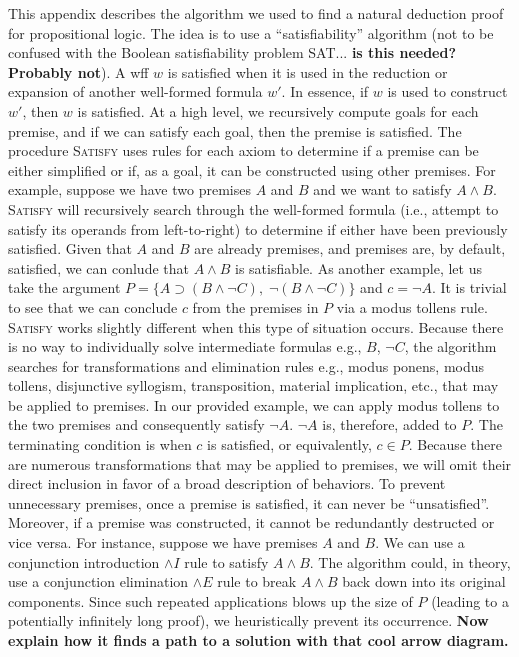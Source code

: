 \documentclass[ms]{uncgdissertationexp2}
\theoremstyle{plain}
\theoremstyle{definition}
\theoremstyle{remark}
\begin{document}
This appendix describes the algorithm we used to find a natural deduction proof for propositional logic. The idea is to use a ``satisfiability'' algorithm (not to be confused with the Boolean satisfiability problem SAT... \textbf{is this needed? Probably not}). A wff $w$ is satisfied when it is used in the reduction or expansion of another well-formed formula $w'$. In essence, if $w$ is used to construct $w'$, then $w$ is satisfied. At a high level, we recursively compute goals for each premise, and if we can satisfy each goal, then the premise is satisfied. The procedure \textsc{Satisfy} uses rules for each axiom to determine if a premise can be either simplified or if, as a goal, it can be constructed using other premises. For example, suppose we have two premises $A$ and $B$ and we want to satisfy $A \land B$. \textsc{Satisfy} will recursively search through the well-formed formula (i.e., attempt to satisfy its operands from left-to-right) to determine if either have been previously satisfied. Given that $A$ and $B$ are already premises, and premises are, by default, satisfied, we can conlude that $A \land B$ is satisfiable. As another example, let us take the argument $P = \{A \supset (B \land \lnot C),\;\lnot (B \land \lnot C)\}$ and $c = \lnot A$. It is trivial to see that we can conclude $c$ from the premises in $P$ via a modus tollens rule. \textsc{Satisfy} works slightly different when this type of situation occurs. Because there is no way to individually solve intermediate formulas e.g., $B$, $\lnot C$, the algorithm searches for transformations and elimination rules e.g., modus ponens, modus tollens, disjunctive syllogism, transposition, material implication, etc., that may be applied to premises. In our provided example, we can apply modus tollens to the two premises and consequently satisfy $\lnot{A}$. $\lnot{A}$ is, therefore, added to $P$. The terminating condition is when $c$ is satisfied, or equivalently, $c \in P$. Because there are numerous transformations that may be applied to premises, we will omit their direct inclusion in favor of a broad description of behaviors. To prevent unnecessary premises, once a premise is satisfied, it can never be ``unsatisfied''. Moreover, if a premise was constructed, it cannot be redundantly destructed or vice versa. For instance, suppose we have premises $A$ and $B$. We can use a conjunction introduction $\land{I}$ rule to satisfy $A \land B$. The algorithm could, in theory, use a conjunction elimination $\land{E}$ rule to break $A \land B$ back down into its original components. Since such repeated applications blows up the size of $P$ (leading to a potentially infinitely long proof), we heuristically prevent its occurrence. \textbf{Now explain how it finds a path to a solution with that cool arrow diagram.}
\end{document}
